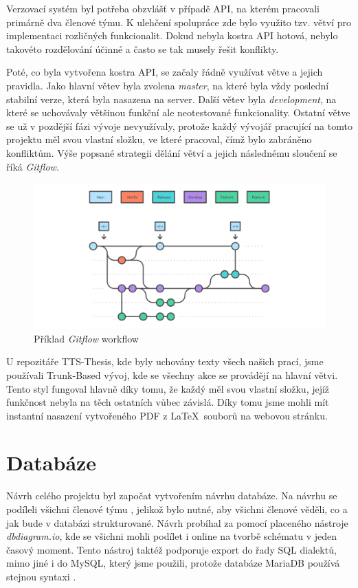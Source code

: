 Verzovací systém byl potřeba obzvlášť v případě API, na kterém pracovali primárně dva členové týmu. K ulehčení spolupráce zde bylo využito tzv. větví pro implementaci rozličných funkcionalit. Dokud nebyla kostra API hotová, nebylo takovéto rozdělování účinné a často se tak musely řešit konflikty.

Poté, co byla vytvořena kostra API, se začaly řádně využívat větve a jejich pravidla. Jako hlavní větev byla zvolena \textit{master}, na které byla vždy poslední stabilní verze, která byla nasazena na server. Další větev byla \textit{development}, na které se uchovávaly většinou funkční ale neotestované funkcionality. Ostatní větve se už v pozdější fázi vývoje nevyužívaly, protože každý vývojář pracující na tomto projektu měl svou vlastní složku, ve které pracoval, čímž bylo zabráněno konfliktům. Výše popsané strategii dělání větví a jejich následnému sloučení se říká \textit{Gitflow}.

\begin{figure}[H]
    \centering
    \includegraphics[width=\textwidth]{figures/impl/git-flow.png}
    \caption{Příklad \textit{Gitflow} workflow \cite{tilburgScienceHub:gitBranching}}
    \label{fig:gitflow}
\end{figure}

U repozitáře TTS-Thesis, kde byly uchovány texty všech našich prací, jsme používali Trunk-Based vývoj, kde se všechny akce se provádějí na hlavní větvi. Tento styl fungoval hlavně díky tomu, že každý měl svou vlastní složku, jejíž funkčnost nebyla na těch ostatních vůbec závislá. Díky tomu jsme mohli mít instantní nasazení vytvořeného PDF z \LaTeX ~souborů na webovou stránku.


\section{Databáze}\label{sec:database}
Návrh celého projektu byl započat vytvořením návrhu databáze. Na návrhu se podíleli všichni členové týmu , jelikož bylo nutné, aby všichni členové věděli, co a jak bude v databázi strukturované. Návrh probíhal za pomocí placeného nástroje \textit{dbdiagram.io}, kde se  všichni mohli podílet i online na tvorbě schématu v jeden časový moment. Tento nástroj taktéž podporuje export do řady SQL dialektů, mimo jiné i do MySQL, který jsme použili, protože databáze MariaDB používá stejnou syntaxi .

